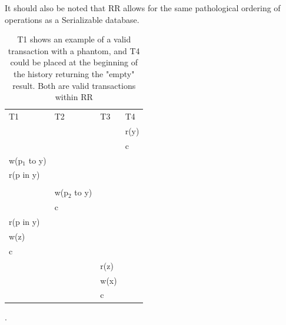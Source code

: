 \documentclass[a4paper,10pt,titlepage]{report}
\begin{document}
It should also be noted that RR allows for the same pathological ordering of operations as a Serializable database.

\begin{table}[h]
\begin{tabular}{l|l|l|l}
T1   & T2   & T3   & T4   \\
     &      &      & r(y) \\
     &      &      & c    \\
w(p$_1$ to y) &      &      &      \\
r(p in y) &      &      &      \\
     &      &      &      \\
     & w(p$_2$ to y) &      &      \\
     & c    &      &      \\
r(p in y) &      &      &      \\
w(z) &      &      &      \\
c    &      &      &      \\
     &      & r(z) &      \\
     &      & w(x) &      \\
     &      & c    &      
\end{tabular}
\caption{T1 shows an example of a valid transaction with a phantom, and T4 could be placed at the beginning of the history returning the "empty" result. Both are valid transactions within RR}.
\end{table}
\end{document}

